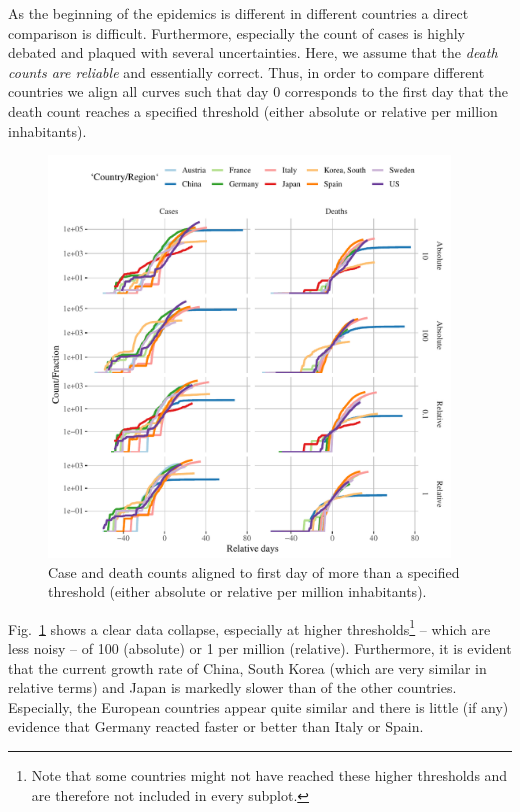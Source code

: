 \documentclass[a4paper]{tufte-handout}
\newcommand{\fig}[1]{Fig.~\ref{fig:#1}}
\begin{document}
As the beginning of the epidemics is different in different countries
a direct comparison is difficult. Furthermore, especially the count of
cases is highly debated and plaqued with several uncertainties. Here,
we assume that the {\em death counts are reliable} and essentially
correct. Thus, in order to compare different countries we align all
curves such that day $0$ corresponds to the first day that the death
count reaches a specified threshold (either absolute or relative per
million inhabitants).

\begin{figure}
  \begin{center}
    \includegraphics[width=0.95\textwidth]{../figs/align_data.pdf}
  \end{center}
  \caption{\label{fig:aligndata} Case and death counts aligned to
    first day of more than a specified threshold (either absolute or
    relative per million inhabitants).}
\end{figure}

\fig{aligndata} shows a clear data collapse, especially at higher
thresholds\footnote{Note that some countries might not have reached
  these higher thresholds and are therefore not included in every
  subplot.} -- which are less noisy -- of 100 (absolute) or 1 per
million (relative). Furthermore, it is evident that the current growth
rate of China, South Korea (which are very similar in relative terms)
and Japan is markedly slower than of the other countries. Especially,
the European countries appear quite similar and there is little (if
any) evidence that Germany reacted faster or better than Italy or
Spain.
\end{document}
